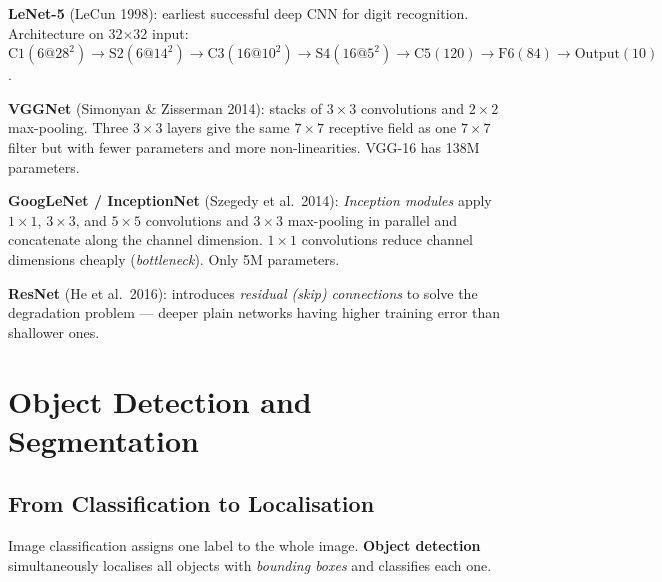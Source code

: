 \documentclass[oneside]{book}
\begin{document}
\textbf{LeNet-5} (LeCun 1998): earliest successful deep CNN for digit
recognition.  Architecture on 32$\times$32 input:
$\mathrm{C1}(6@28^2) \to \mathrm{S2}(6@14^2) \to \mathrm{C3}(16@10^2)
\to \mathrm{S4}(16@5^2) \to \mathrm{C5}(120) \to \mathrm{F6}(84)
\to \mathrm{Output}(10)$.

\textbf{VGGNet} (Simonyan \& Zisserman 2014): stacks of $3\times3$
convolutions and $2\times2$ max-pooling.  Three $3\times3$ layers give the
same $7\times7$ receptive field as one $7\times7$ filter but with fewer
parameters and more non-linearities.  VGG-16 has 138M parameters.

\textbf{GoogLeNet / InceptionNet} (Szegedy et al.\ 2014): \emph{Inception
modules} apply $1\times1$, $3\times3$, and $5\times5$ convolutions and
$3\times3$ max-pooling in parallel and concatenate along the channel
dimension.  $1\times1$ convolutions reduce channel dimensions cheaply
(\emph{bottleneck}).  Only 5M parameters.

\textbf{ResNet} (He et al.\ 2016): introduces \emph{residual (skip)
connections} to solve the degradation problem — deeper plain networks
having higher training error than shallower ones.



\chapter{Object Detection and Segmentation}

\section{From Classification to Localisation}

Image classification assigns one label to the whole image.
\textbf{Object detection} simultaneously localises all objects with
\emph{bounding boxes} and classifies each one.
\end{document}
